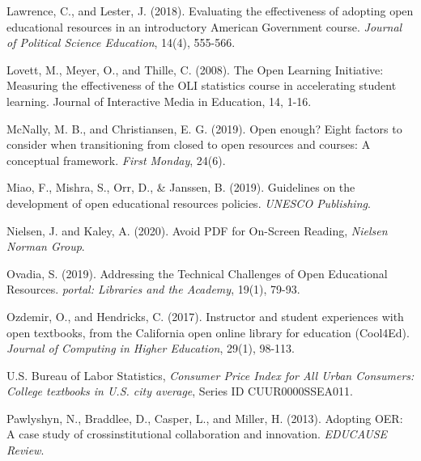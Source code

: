 \documentclass[11pt]{article}
\newcommand{\alink}[2]{\href{#1}{\textcolor{blue}{#2}}}
\begin{document}
\begin{thebibliography}{99}
   Lawrence, C., and Lester, J. (2018). Evaluating the effectiveness of adopting open educational resources in an introductory American Government course. {\em Journal of Political Science Education}, 14(4), 555-566.

   Lovett, M., Meyer, O., and Thille, C. (2008). The Open Learning Initiative: Measuring the effectiveness of the OLI statistics course in accelerating student learning. Journal of Interactive Media in Education, 14, 1-16.

   McNally, M. B., and Christiansen, E. G. (2019). Open enough? Eight factors to consider when transitioning from closed to open resources and courses: A conceptual framework. {\em First Monday}, 24(6).%

   Miao, F., Mishra, S., Orr, D., \& Janssen, B. (2019). Guidelines on the development of open educational resources policies. {\em UNESCO Publishing}.%

   Nielsen, J. and Kaley, A. (2020).  Avoid PDF for On-Screen Reading, {\em Nielsen Norman Group}.%
  
   Ovadia, S. (2019). Addressing the Technical Challenges of Open Educational Resources.  {\em portal: Libraries and the Academy}, 19(1), 79-93.%

   Ozdemir, O., and Hendricks, C. (2017). Instructor and student experiences with open textbooks, from the California open online library for education (Cool4Ed). {\em Journal of Computing in Higher Education}, 29(1), 98-113.

   U.S. Bureau of Labor Statistics, {\em Consumer Price Index for All Urban Consumers: College textbooks in U.S. city average}, Series ID CUUR0000SSEA011.%

   Pawlyshyn, N., Braddlee, D., Casper, L., and Miller, H. (2013). Adopting OER: A case study of crossinstitutional collaboration and innovation. {\em EDUCAUSE Review}.


\end{thebibliography}
\end{document}

